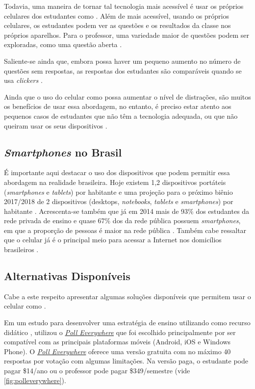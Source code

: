 Todavia, uma maneira de tornar tal tecnologia mais acessível é usar os próprios
celulares dos estudantes como {\clickers} \cite{Stowell2015, Morrell2015, Araujo2013}.
Além de mais acessível, usando os próprios celulares, os estudantes podem
ver as questões e os resultados da classe nos próprios aparelhos. Para o professor,
uma variedade maior de questões podem ser exploradas, como uma  questão aberta \cite{Stowell2015}.

Saliente-se ainda que, embora possa haver um pequeno aumento no número de questões
sem respostas, as respostas dos estudantes são comparáveis quando se usa
\textit{clickers} \cite{Morrell2015, Stowell2015}.

Ainda que o uso do celular como {\clicker} possa aumentar o nível de
distrações, são muitos os benefícios de usar essa abordagem, no entanto,
é preciso estar atento aos pequenos casos de estudantes que não têm a tecnologia
adequada, ou que não queiram usar os seus dispositivos \cite{Morrell2015, Stowell2015}.

\subsection{\textit{Smartphones} no Brasil}

É importante aqui destacar o uso dos dispositivos que podem permitir essa abordagem
na realidade brasileira. Hoje existem 1,2 dispositivos portáteis
(\textit{smartphones} e \textit{tablets}) por habitante e uma projeção para o próximo
biênio 2017/2018 de 2 dispositivos
(desktops, \textit{notebooks}, \textit{tablets} e \textit{smartphones}) por habitante \cite[p. 8]{Meirelles2016}.
Acrescenta-se também que já em 2014 mais de 93\% dos estudantes da rede privada de
ensino e quase 67\% dos da rede pública possuem \textit{smartphones}, em que a
proporção de pessoas é maior na rede pública \cite[p. 55]{IBGE2016}. Também cabe
ressaltar que o celular já é o principal meio para acessar a Internet nos domicílios
brasileiros \cite[p. 41]{IBGE2016}.

\subsection{Alternativas Disponíveis}
\label{subp:alternativas_disponiveis}

Cabe a este respeito apresentar algumas soluções disponíveis que permitem usar o celular como
{\clicker}.

Em um estudo para desenvolver uma estratégia de ensino utilizando
{\clickers} como recurso didático , utilizou o
\href{https://www.polleverywhere.com/}{\textit{Poll Everywhere}} que foi
escolhido principalmente por ser compatível com as principais plataformas
móveis (Android, iOS e Windows Phone). O
\href{https://www.polleverywhere.com/}{\textit{Poll Everywhere}} oferece uma
versão gratuita com no máximo 40 respostas por votação com algumas limitações.
Na versão paga, o estudante pode pagar \$14/ano ou o professor pode pagar
\$349/semestre (vide \autoref{fig:polleverywhere}).

